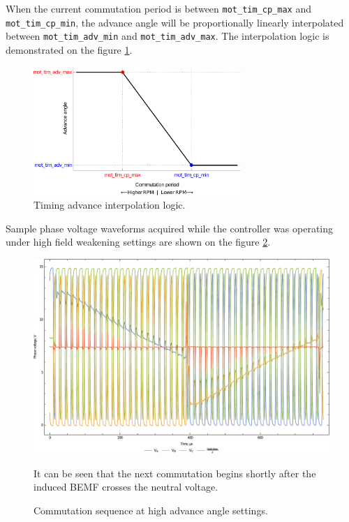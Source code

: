 \documentclass{zubaxdoc}
\begin{document}
When the current commutation period is between \verb|mot_tim_cp_max| and \verb|mot_tim_cp_min|,
the advance angle will be proportionally linearly interpolated between
\verb|mot_tim_adv_min| and \verb|mot_tim_adv_max|.
The interpolation logic is demonstrated on the figure \ref{timing_advance_interpolation_plot}.

\begin{figure}[hbt]
    \centering
	\includegraphics[width=0.7\textwidth]{timing_advance_interpolation_plot}
	\caption{Timing advance interpolation logic.
	\label{timing_advance_interpolation_plot}}
\end{figure}

Sample phase voltage waveforms acquired while the controller was operating under high field
weakening settings are shown on the figure \ref{phase_voltages_at_high_advance_angle}.

\begin{figure}[hbtp]
    \centering
	\includegraphics[width=\textwidth]{phase_voltages_at_high_advance_angle}
	\caption{Commutation sequence at high advance angle settings.
	\label{phase_voltages_at_high_advance_angle}}
	It can be seen that the next commutation begins shortly after the induced BEMF
	crosses the neutral voltage.
\end{figure}
\end{document}
